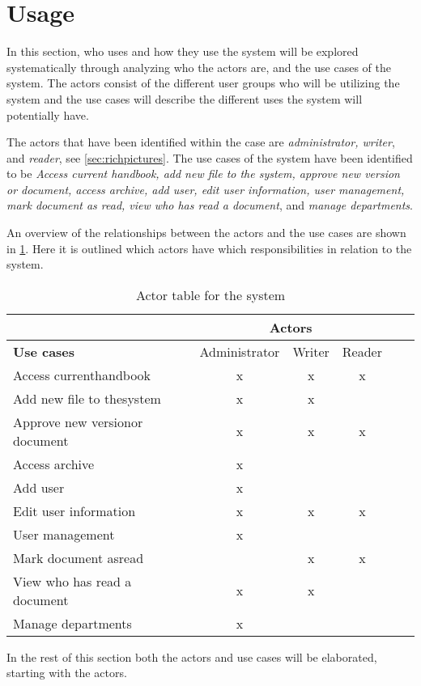 \section{Usage}\label{sec:Usage}
In this section, who uses and how they use the system will be explored systematically through analyzing who the actors are, and the use cases of the system.
The actors consist of the different user groups who will be utilizing the system and the use cases will describe the different uses the system will potentially have.

The actors that have been identified within the case are \textit{administrator, writer}, and \textit{reader}, see \cref{sec:richpictures}.
The use cases of the system have been identified to be \textit{Access current handbook, add new file to the system, approve new version or document, access archive, add user, edit user information, user management, mark document as read, view who has read a document}, and \textit{manage departments}.

An overview of the relationships between the actors and the use cases are shown in \cref{tab:ActorTable}.
Here it is outlined which actors have which responsibilities in relation to the system.

\begin{table}[H]
	\begin{center}
	\begin{tabular}{| m{10em} | c | c | c | c | c |}
		\hline
		& \multicolumn{3}{c|}{\textbf{Actors}} \\
		\hline
		\textbf{Use cases} & Administrator  & Writer & Reader \\
		\hline
		Access current\newline handbook & x & x & x \\
		\hline
		Add new file to the\newline system & x & x & \\
		\hline
		Approve new version\newline or document & x & x & x \\
		\hline
		Access archive & x & & \\
		\hline
		Add user & x & & \\
		\hline
		Edit user information & x & x & x\\
		\hline
		User management & x & & \\
		\hline
		Mark document as\newline read & & x & x \\
		\hline
		View who has read a document & x & x & \\
		\hline
		Manage departments & x & & \\
		\hline
	\end{tabular}
	\end{center}
	\caption{Actor table for the system}\label{tab:ActorTable}
\end{table}

In the rest of this section both the actors and use cases will be elaborated, starting with the actors.
